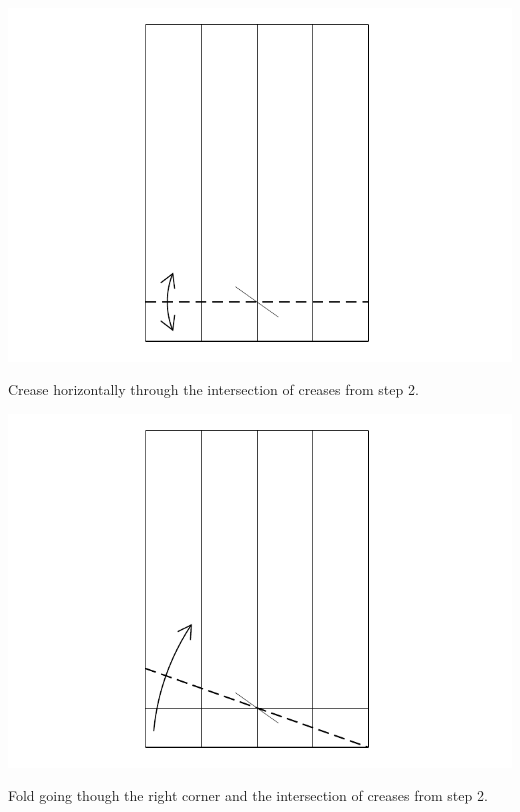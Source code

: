 \documentclass[11pt]{article}
\begin{document}
\begin{minipage}[t]{0.45\textwidth}
  \includegraphics[width=\textwidth]{../figs/fig10-04}
  \begin{itemize}{\item[4.] Crease horizontally through the intersection of creases from step 2.}\end{itemize}
\end{minipage}
\hfill
\begin{minipage}[t]{0.45\textwidth}
  \includegraphics[width=\textwidth]{../figs/fig10-05}
  \begin{itemize}{\item[5.] Fold going though the right corner and the intersection of creases from step 2.}\end{itemize}
\end{minipage}
\end{document}
